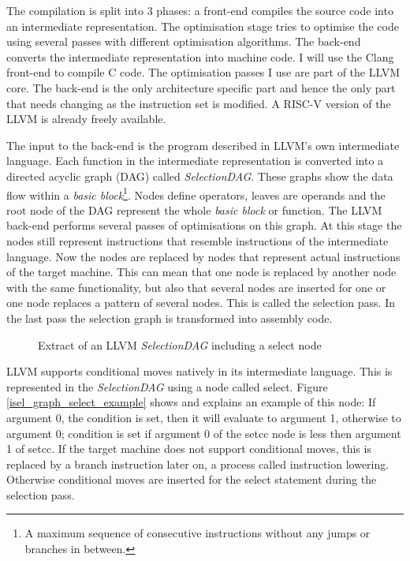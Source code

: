 \documentclass[12pt,twoside,notitlepage]{report}
\begin{document}
The compilation is split into 3 phases: a front-end compiles the source code into an intermediate representation. The optimisation stage tries to optimise the code using several passes with different optimisation algorithms. The back-end converts the intermediate representation into machine code. I will use the Clang front-end to compile C code. The optimisation passes I use are part of the LLVM core. The back-end is the only architecture specific part and hence the only part that needs changing as the instruction set is modified. A RISC-V version of the LLVM is already freely available\cite{riscvWebsite}.

The input to the back-end is the program described in LLVM's own intermediate language. Each function in the intermediate representation is converted into a directed acyclic graph (DAG) called \textit{SelectionDAG}. These graphs show the data flow within a \textit{basic block}\footnote{A maximum sequence of consecutive instructions without any jumps or branches in between.}. Nodes define operators, leaves are operands and the root node of the DAG represent the whole \textit{basic block} or function. The LLVM back-end performs several passes of optimisations on this graph. At this stage the nodes still represent instructions that resemble instructions of the intermediate language. Now the nodes are replaced by nodes that represent actual instructions of the target machine. This can mean that one node is replaced by another node with the same functionality, but also that several nodes are inserted for one or one node replaces a pattern of several nodes. This is called the selection pass. In the last pass the selection graph is transformed into assembly code.

\begin{figure}[h]
\centering
\caption{Extract of an LLVM \textit{SelectionDAG} including a select node}
\end{figure}

LLVM supports conditional moves natively in its intermediate language. This is represented in the \textit{SelectionDAG} using a node called select. Figure \ref{isel_graph_select_example} shows and explains an example of this node: If argument 0, the condition is set, then it will evaluate to argument 1, otherwise to argument 0; condition is set if argument 0 of the setcc node is less then argument 1 of setcc. If the target machine does not support conditional moves, this is replaced by a branch instruction later on, a process called instruction lowering. Otherwise conditional moves are inserted for the select statement during the selection pass.
\end{document}
